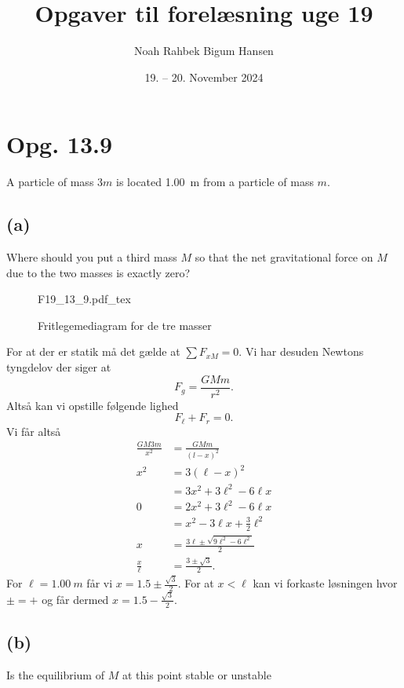 \documentclass[12pt]{article}
\title{Opgaver til forelæsning uge 19}
\author{Noah Rahbek Bigum Hansen}
\date{19. -- 20. November 2024}
\newcommand{\incfig}[2][1]{%
  \def\svgwidth{#1\columnwidth}
  {#2.pdf_tex}
}
\theoremstyle{definition}
\begin{document}
\maketitle

\section*{Opg. 13.9}
A particle of mass $3m$ is located \qty{1,00}{m} from a particle of mass $m$.

\subsection*{(a)}
Where should you put a third mass $M$ so that the net gravitational force on $M$ due to the two masses is exactly zero?
\bigbreak
\begin{figure}[ht]
  \centering
  \incfig[0.8]{F19_13_9}
  \caption{Fritlegemediagram for de tre masser}
  \label{fig:F19_13_9}
\end{figure}

For at der er statik må det gælde at $\sum F_{xM} = 0$. Vi har desuden Newtons tyngdelov der siger at
\[ 
F_g = \frac{GMm}{r^2}
.\]
Altså kan vi opstille følgende lighed
\[ 
F_{\ell} + F_r = 0
.\]
Vi får altså
\begin{align*}
  \frac{GM3m}{x^2} &= \frac{GMm}{(l-x)^2}  \\
  x^2 &= 3(\ell-x)^2  \\
  &= 3x^2 + 3\ell^2 - 6\ell x  \\
  0 &= 2x^2 + 3\ell^2 - 6\ell x  \\
  &= x^2 - 3\ell x + \frac{3}{2}\ell^2  \\
  x &= \frac{3\ell \pm \sqrt{9\ell^2 - 6 \ell^2}}{2} \\
  \frac{x}{\ell} &= \frac{3 \pm \sqrt{3}}{2}
.\end{align*}
For $\ell = \qty{1,00}{m}$ får vi $x = \num{1,5} \pm \frac{\sqrt{3}}{2}$. For at $x < \ell$ kan vi forkaste løsningen hvor $\pm = +$ og får dermed $x = \num{1,5} - \frac{\sqrt{3}}{2}$.

\subsection*{(b)}
Is the equilibrium of $M$ at this point stable or unstable 
\end{document}
